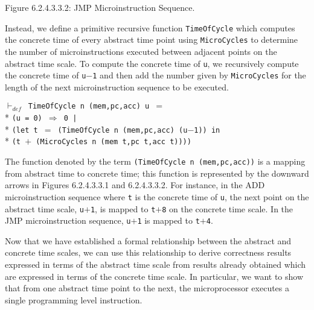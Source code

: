 \begin{normalsize}
\begin{center}
\begin{picture}
\end{picture}

Figure 6.2.4.3.3.2: JMP Microinstruction Sequence.
\end{center}

Instead, we define a primitive recursive function \verb"TimeOfCycle" which
computes the concrete time of every abstract time point
using \verb"MicroCycles" to determine the number of microinstructions
executed between adjacent points on the abstract time scale.
To compute the concrete time of \verb"u",
we recursively compute the concrete time of \mbox{\verb"u"$-$\verb"1"}
and then add the number given by \verb"MicroCycles" for
the length of the next microinstruction sequence
to be executed.

\hspace*{\fill}
\begin{minipage}{17cm}
$\vdash_{def}$\verb" TimeOfCycle n (mem,pc,acc) u "$=$\\*
\verb"(u = 0) "$\Rightarrow$\verb" 0 |"\\*
\verb"(let t "$=$\verb" (TimeOfCycle n (mem,pc,acc) (u"$-$\verb"1)) in"\\*
\verb"(t "$+$\verb" (MicroCycles n (mem t,pc t,acc t))))"
\end{minipage}
\hspace*{\fill}

The function denoted by the term \verb"(TimeOfCycle n (mem,pc,acc))" is a
mapping from abstract time to concrete time;
this function is represented by the downward arrows in Figures
\mbox{6.2.4.3.3.1} and \mbox{6.2.4.3.3.2}.
For instance, in the ADD microinstruction sequence where \verb"t" is
the concrete time of \verb"u",
the next point on the abstract time scale, \mbox{\verb"u"$+$\verb"1"},
is mapped to \mbox{\verb"t"$+$\verb"8"} on the concrete time scale.
In the JMP microinstruction sequence, \mbox{\verb"u"$+$\verb"1"}
is mapped to \mbox{\verb"t"$+$\verb"4"}.

Now that we have established a formal relationship between
the abstract and concrete time scales,
we can use this relationship to derive
correctness results expressed in terms of the abstract time scale
from results already obtained which are expressed in terms
of the concrete time scale.
In particular, we want to show that
from one abstract time point to the next,
the microprocessor executes a single programming level instruction.


\end{normalsize}
